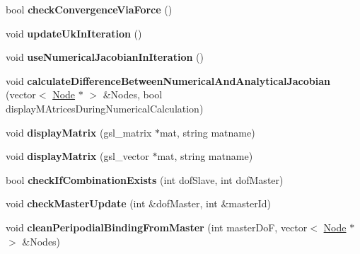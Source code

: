 \begin{DoxyCompactItemize}
\item 
\hypertarget{classNewtonRaphsonSolver_a16edb5206c079476a0d6c2c956c65f25}{}bool {\bfseries check\+Convergence\+Via\+Force} ()\label{classNewtonRaphsonSolver_a16edb5206c079476a0d6c2c956c65f25}

\item 
\hypertarget{classNewtonRaphsonSolver_a5e457b3608c6fbd71767cd6eed07b2f7}{}void {\bfseries update\+Uk\+In\+Iteration} ()\label{classNewtonRaphsonSolver_a5e457b3608c6fbd71767cd6eed07b2f7}

\item 
\hypertarget{classNewtonRaphsonSolver_a6cc1ea27b707135cad7f5af378d716b5}{}void {\bfseries use\+Numerical\+Jacobian\+In\+Iteration} ()\label{classNewtonRaphsonSolver_a6cc1ea27b707135cad7f5af378d716b5}

\item 
\hypertarget{classNewtonRaphsonSolver_a0b340995ccc191634bd1b9ca05104735}{}void {\bfseries calculate\+Difference\+Between\+Numerical\+And\+Analytical\+Jacobian} (vector$<$ \hyperlink{classNode}{Node} $\ast$ $>$ \&Nodes, bool display\+M\+Atrices\+During\+Numerical\+Calculation)\label{classNewtonRaphsonSolver_a0b340995ccc191634bd1b9ca05104735}

\item 
\hypertarget{classNewtonRaphsonSolver_aa70b80e58bc0c5126b660d9c0686418c}{}void {\bfseries display\+Matrix} (gsl\+\_\+matrix $\ast$mat, string matname)\label{classNewtonRaphsonSolver_aa70b80e58bc0c5126b660d9c0686418c}

\item 
\hypertarget{classNewtonRaphsonSolver_a59e1acc3e0dcb3fb69e4453923c50902}{}void {\bfseries display\+Matrix} (gsl\+\_\+vector $\ast$mat, string matname)\label{classNewtonRaphsonSolver_a59e1acc3e0dcb3fb69e4453923c50902}

\item 
\hypertarget{classNewtonRaphsonSolver_a9cdedabbc023ac182c924b1ec6c3804d}{}bool {\bfseries check\+If\+Combination\+Exists} (int dof\+Slave, int dof\+Master)\label{classNewtonRaphsonSolver_a9cdedabbc023ac182c924b1ec6c3804d}

\item 
\hypertarget{classNewtonRaphsonSolver_a1cc04a2a1d6132eb01437f318bcb5103}{}void {\bfseries check\+Master\+Update} (int \&dof\+Master, int \&master\+Id)\label{classNewtonRaphsonSolver_a1cc04a2a1d6132eb01437f318bcb5103}

\item 
\hypertarget{classNewtonRaphsonSolver_a801b9a0287b310a1d4ceba35672f7508}{}void {\bfseries clean\+Peripodial\+Binding\+From\+Master} (int master\+Do\+F, vector$<$ \hyperlink{classNode}{Node} $\ast$ $>$ \&Nodes)\label{classNewtonRaphsonSolver_a801b9a0287b310a1d4ceba35672f7508}


\end{DoxyCompactItemize}
